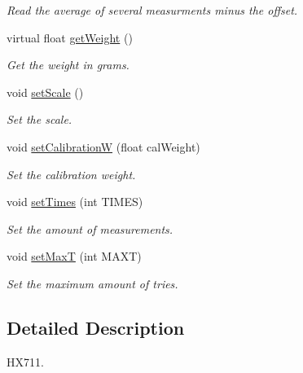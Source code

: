 \begin{DoxyCompactItemize}
\begin{DoxyCompactList}\small\item\em Read the average of several measurments minus the offset. \end{DoxyCompactList}\item 
virtual float \hyperlink{classhx711_ab48ca212b0d0afb494e3f2fcbefa3985}{get\+Weight} ()
\begin{DoxyCompactList}\small\item\em Get the weight in grams. \end{DoxyCompactList}\item 
void \hyperlink{classhx711_a837e9ae5cc8d8f22281e2e43be139606}{set\+Scale} ()
\begin{DoxyCompactList}\small\item\em Set the scale. \end{DoxyCompactList}\item 
\mbox{\label{classhx711_ac8ccb8783476e82401824e937735f9d2}} 
void \hyperlink{classhx711_ac8ccb8783476e82401824e937735f9d2}{set\+CalibrationW} (float cal\+Weight)
\begin{DoxyCompactList}\small\item\em Set the calibration weight. \end{DoxyCompactList}\item 
\mbox{\label{classhx711_ae35d76b171adff7570a431116d4f5810}} 
void \hyperlink{classhx711_ae35d76b171adff7570a431116d4f5810}{set\+Times} (int T\+I\+M\+ES)
\begin{DoxyCompactList}\small\item\em Set the amount of measurements. \end{DoxyCompactList}\item 
\mbox{\label{classhx711_a6225c6fc0c76e0f1008c9500379f78b4}} 
void \hyperlink{classhx711_a6225c6fc0c76e0f1008c9500379f78b4}{set\+MaxT} (int M\+A\+XT)
\begin{DoxyCompactList}\small\item\em Set the maximum amount of tries. \end{DoxyCompactList}\end{DoxyCompactItemize}


\subsection{Detailed Description}
H\+X711. 

